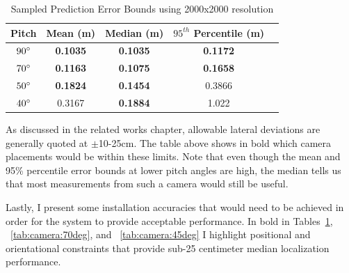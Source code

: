 \documentclass[a4paper,12pt,twoside,openright]{report}
\begin{document}
\begin{table}[htb]
    \centering
    \caption{Sampled Prediction Error Bounds using 2000x2000 resolution}
    \label{tab:camera:best error bounds}
    \begin{tabular}{@{}ccccc@{}}
        \toprule 
        \textbf{Pitch}       & \textbf{Mean (m)}   & \textbf{Median (m)} & \textbf{$95^{th}$ Percentile (m)} &  \\ \midrule 
        $90\degree$ & \textbf{0.1035} & \textbf{0.1035} & \textbf{0.1172}           &  \\ 
        $70\degree$ & \textbf{0.1163} & \textbf{0.1075} & \textbf{0.1658}           &  \\
        $50\degree$ & \textbf{0.1824} & \textbf{0.1454} & 0.3866           &  \\
        $40\degree$ & 0.3167 & \textbf{0.1884} & 1.022            &  \\ \midrule
    \end{tabular}
\end{table}


As discussed in the related works chapter, allowable lateral deviations are generally
quoted at $\pm$10-25cm. The table above shows in bold which camera placements would be 
within these limits. Note that even though the mean and 95\% percentile error bounds
at lower pitch angles are high, the median tells us that most measurements
from such a camera would still be useful.

Lastly, I present some installation accuracies that would need to be achieved
in order for the system to provide acceptable performance. In bold in 
Tables~\ref{tab:camera:best error bounds}, ~\ref{tab:camera:70deg}, and
~\ref{tab:camera:45deg} I highlight positional and orientational 
constraints that provide sub-25 centimeter median localization performance.
\end{document}
